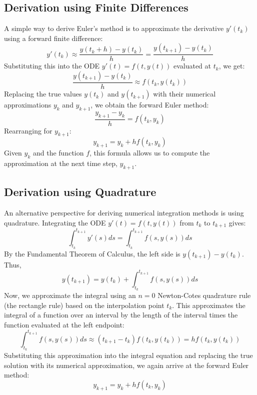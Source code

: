 \documentclass{article}
\begin{document}
\subsection{Derivation using Finite Differences}
A simple way to derive Euler's method is to approximate the derivative $y'(t_k)$ using a forward finite difference:
\[ y'(t_k) \approx \frac{y(t_k+h) - y(t_k)}{h} = \frac{y(t_{k+1}) - y(t_k)}{h} \]
Substituting this into the ODE $y'(t) = f(t, y(t))$ evaluated at $t_k$, we get:
\[ \frac{y(t_{k+1}) - y(t_k)}{h} \approx f(t_k, y(t_k)) \]
Replacing the true values $y(t_k)$ and $y(t_{k+1})$ with their numerical approximations $y_k$ and $y_{k+1}$, we obtain the forward Euler method:
\[ \frac{y_{k+1} - y_k}{h} = f(t_k, y_k) \]
Rearranging for $y_{k+1}$:
\[ y_{k+1} = y_k + h f(t_k, y_k) \]
Given $y_k$ and the function $f$, this formula allows us to compute the approximation at the next time step, $y_{k+1}$.
\subsection{Derivation using Quadrature}
An alternative perspective for deriving numerical integration methods is using quadrature. Integrating the ODE $y'(t) = f(t, y(t))$ from $t_k$ to $t_{k+1}$ gives:
\[ \int_{t_k}^{t_{k+1}} y'(s) ds = \int_{t_k}^{t_{k+1}} f(s, y(s)) ds \]
By the Fundamental Theorem of Calculus, the left side is $y(t_{k+1}) - y(t_k)$. Thus,
\[ y(t_{k+1}) = y(t_k) + \int_{t_k}^{t_{k+1}} f(s, y(s)) ds \]
Now, we approximate the integral using an $n=0$ Newton-Cotes quadrature rule (the rectangle rule) based on the interpolation point $t_k$. This approximates the integral of a function over an interval by the length of the interval times the function evaluated at the left endpoint:
\[ \int_{t_k}^{t_{k+1}} f(s, y(s)) ds \approx (t_{k+1} - t_k) f(t_k, y(t_k)) = h f(t_k, y(t_k)) \]
Substituting this approximation into the integral equation and replacing the true solution with its numerical approximation, we again arrive at the forward Euler method:
\[ y_{k+1} = y_k + h f(t_k, y_k) \]
\end{document}
